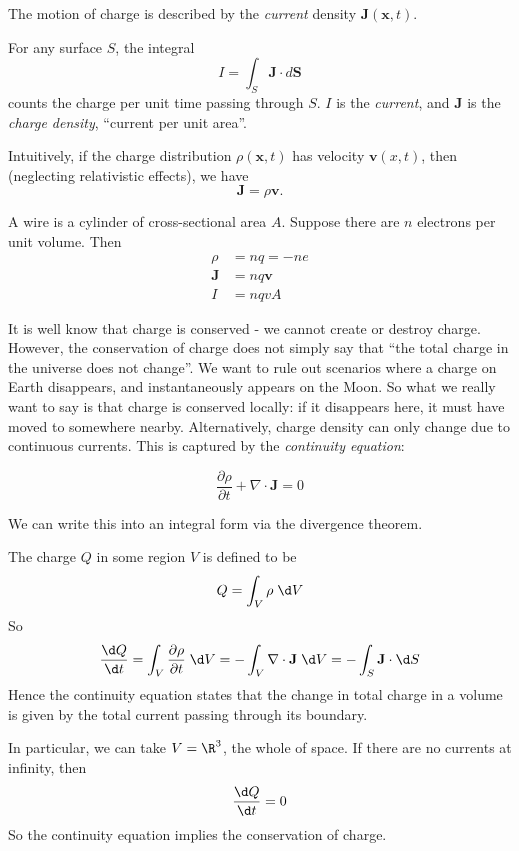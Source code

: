 \documentclass[a4paper]{article}
\begin{document}
The motion of charge is described by the \emph{current} density $\mathbf{J}(\mathbf{x}, t)$.
\begin{defi}
For any surface $S$, the integral
\[
  I = \int_S \mathbf{J}\cdot d\mathbf{S}
\]
counts the charge per unit time passing through $S$. $I$ is the \emph{current}, and $\mathbf{J}$ is the \emph{charge density}, ``current per unit area''.
\end{defi}
Intuitively, if the charge distribution $\rho (\mathbf{x}, t)$ has velocity $\mathbf{v}(x, t)$, then (neglecting relativistic effects), we have
\[
  \mathbf{J} = \rho \mathbf{v}.
\]

\begin{eg}
  A wire is a cylinder of cross-sectional area $A$. Suppose there are $n$ electrons per unit volume. Then
  \begin{align*}
    \rho &= nq = -ne\\
    \mathbf{J} &= nq\mathbf{v}\\
    I &= nqvA
  \end{align*}
\end{eg}

It is well know that charge is conserved - we cannot create or destroy charge. However, the conservation of charge does not simply say that ``the total charge in the universe does not change''. We want to rule out scenarios where a charge on Earth disappears, and instantaneously appears on the Moon. So what we really want to say is that charge is conserved locally: if it disappears here, it must have moved to somewhere nearby. Alternatively, charge density can only change due to continuous currents. This is captured by the \emph{continuity equation}:
\begin{law}
  \[
    \frac{\partial\rho}{\partial t} + \nabla\cdot \mathbf{J} = 0
  \]
\end{law}
We can write this into an integral form via the divergence theorem.

The charge $Q$ in some region $V$ is defined to be
\[
  Q = \int_V \rho \;\d V
\]
So
\[
  \frac{\d Q}{\d t} = \int_V \frac{\partial\rho}{\partial t}\; \d V = -\int_V \nabla\cdot \mathbf{J}\; \d V = -\int_S \mathbf{J}\cdot \d S
\]
Hence the continuity equation states that the change in total charge in a volume is given by the total current passing through its boundary.

In particular, we can take $V = \R^3$, the whole of space. If there are no currents at infinity, then
\[
  \frac{\d Q}{\d t} = 0
\]
So the continuity equation implies the conservation of charge.
\end{document}
